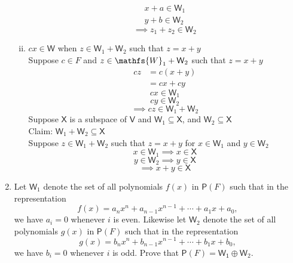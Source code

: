 \documentclass[letterpaper,12pt]{article}
\newcommand{\?}{\stackrel{?}{=}}
\begin{document}
\begin{spacing}{1.5}
\begin{enumerate}
\begin{enumerate}[(i)]
\begin{align}
x+a\in \mathsf{W}_1\\
y+b\in \mathsf{W}_2
\end{align}
\begin{equation}
\implies z_1 + z_2 \in \mathsf{W}_2
\end{equation}
\item $cx \in \mathsf{W}$ when $z \in \mathsf{W}_1 + \mathsf{W}_2$
  such that $z=x+y$
\\
Suppose $c \in F$ and $z \in \mathfs{W}_1 + \mathsf{W}_2$ such that $z
= x+y$
\begin{align}
cz &= c\left(x+y\right)\\
&= cx +cy 
\end{align}
\begin{equation}
cx \in \mathsf{W}_1
\end{equation}
\begin{equation}
cy \in \mathsf{W}_2
\end{equation}
\begin{equation}
\implies cz \in \mathsf{W}_1 + \mathsf{W}_2
\end{equation}
Suppose $\mathsf{X}$ is a subspace of $\mathsf{V}$ and $\mathsf{W}_1
\subseteq \mathsf{X}$, and $\mathsf{W}_2 \subseteq \mathsf{X}$
\\
Claim: $\mathsf{W}_1 + \mathsf{W}_2 \subseteq \mathsf{X}$
\\
Suppose $z \in \mathsf{W}_1 + \mathsf{W}_2$ such that $z = x+y$ for $x
\in \mathsf{W}_1 $ and $y \in \mathsf{W}_2$
\begin{equation}
x \in \mathsf{W}_1 \implies x \in \mathsf{X}
\end{equation}
\begin{equation}
y \in \mathsf{W}_2 \implies y \in \mathsf{X}
\end{equation}
\begin{equation}
\implies x + y \in \mathsf{X}
\end{equation}
\end{enumerate}
\newpage{}
\setcounter{enumi}{24}
\item Let $\mathsf{W}_1$ denote the set of all polynomials $f(x)$ in
  $\mathsf{P}(F)$ such that in the representation
\[
f(x) = a_nx^n +a_{n-1}x^{n-1} + \cdots + a_1x+a_0,
\]
we have $a_i = 0$ whenever $i$ is even. Likewise let $\mathsf{W}_2$
denote the set of all polynomials $g(x)$ in $\mathsf{P}(F)$ such that
in the representation 
\[
g(x) = b_nx^n +b_{n-1}x^{n-1} + \cdots + b_1x+b_0,
\]
we have $b_i = 0$ whenever $i$ is odd. Prove that $\mathsf{P}(F) =
\mathsf{W_1} \oplus \mathsf{W}_2$.

\end{enumerate}
\end{spacing}
\end{document}
